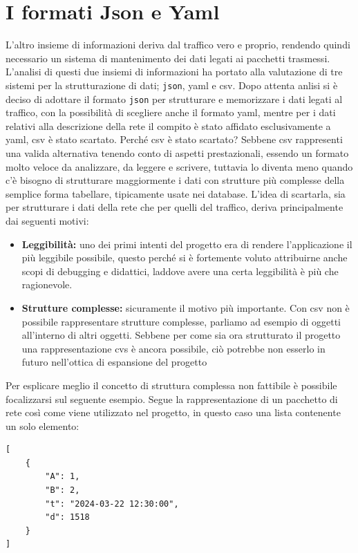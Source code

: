 \documentclass[binding=0.6cm]{sapthesis}
\begin{document}
\section{I formati Json e Yaml}
L'altro insieme di informazioni deriva dal traffico vero e proprio, rendendo quindi necessario un sistema di mantenimento dei dati legati ai pacchetti trasmessi. L'analisi di questi due insiemi di informazioni ha portato alla valutazione di tre sistemi per la strutturazione di dati; \texttt{json}\cite{rfc8259}, yaml\cite{RFC9512} e csv\cite{RFC4180}.
Dopo attenta anlisi si è deciso di adottare il formato \texttt{json} per strutturare e memorizzare i dati legati al traffico, con la possibilità di scegliere anche il formato yaml, mentre per i dati relativi alla descrizione della rete il compito è stato affidato esclusivamente a yaml, csv è stato scartato.
Perché csv è stato scartato? Sebbene csv rappresenti una valida alternativa tenendo conto di aspetti prestazionali, essendo un formato molto veloce da analizzare, da leggere e scrivere, tuttavia lo diventa meno quando c'è bisogno di strutturare maggiormente i dati con strutture più complesse della semplice forma tabellare, tipicamente usate nei database. 
L'idea di scartarla, sia per strutturare i dati della rete che per quelli del traffico, deriva principalmente dai seguenti motivi:

\begin{itemize}
    \item \textbf{Leggibilità:} uno dei primi intenti del progetto era di rendere l'applicazione il più leggibile possibile, questo perché si è
    fortemente voluto attribuirne anche scopi di debugging e didattici, laddove avere una certa leggibilità è più che ragionevole.
    \item \textbf{Strutture complesse:} sicuramente il motivo più importante. Con csv non è possibile rappresentare strutture complesse, parliamo ad esempio di oggetti
    all'interno di altri oggetti. Sebbene per come sia ora strutturato il progetto una rappresentazione cvs è ancora possibile, ciò potrebbe non esserlo in futuro
    nell'ottica di espansione del progetto
\end{itemize}
Per esplicare meglio il concetto di struttura complessa non fattibile è possibile focalizzarsi
 sul seguente esempio. Segue la rappresentazione di un pacchetto di rete così come viene
 utilizzato nel progetto, in questo caso una lista contenente un solo elemento:

 {\scriptsize %
\begin{lstlisting}[caption={Pacchetto di rete rappresentato in json}, label={fig:packet_example}]
[    
    {
        "A": 1,
        "B": 2,
        "t": "2024-03-22 12:30:00",
        "d": 1518
    }
]
\end{lstlisting}
 }
\end{document}
